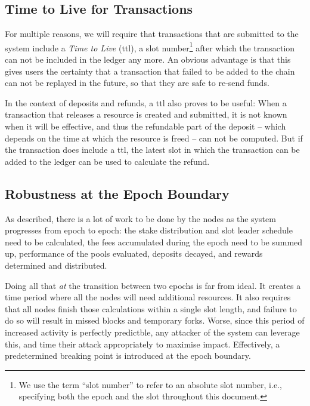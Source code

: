 \documentclass[11pt,a4paper]{article}
\begin{document}
\subsection{Time to Live for Transactions}
\label{time-to-live-for-transactions}

For multiple reasons, we will require that transactions that are submitted to
the system include a \emph{Time to Live} (ttl), a slot number\footnote{We use
  the term ``slot number'' to refer to an absolute slot number, i.e., specifying
  both the epoch and the slot throughout this document.} after which the
transaction can not be included in the ledger any more. An obvious advantage is
that this gives users the certainty that a transaction that failed to be added
to the chain can not be replayed in the future, so that they are safe to re-send
funds.

In the context of deposits and refunds, a ttl also proves to be useful: When a
transaction that releases a resource is created and submitted, it is not known
when it will be effective, and thus the refundable part of the deposit -- which
depends on the time at which the resource is freed -- can not be computed. But
if the transaction does include a ttl, the latest slot in which the transaction
can be added to the ledger can be used to calculate the refund.

\subsection{Robustness at the Epoch Boundary}
\label{robustness-at-the-epoch-boundary}

As described, there is a lot of work to be done by the nodes as the system
progresses from epoch to epoch: the stake distribution and slot leader schedule
need to be calculated, the fees accumulated during the epoch need to be
summed up, performance of the pools evaluated, deposits decayed, and
rewards determined and distributed.

Doing all that \emph{at} the transition between two epochs is far from ideal. It
creates a time period where all the nodes will need additional resources. It
also requires that all nodes finish those calculations within a single slot
length, and failure to do so will result in missed blocks and temporary forks.
Worse, since this period of increased activity is perfectly predictble, any
attacker of the system can leverage this, and time their attack appropriately to
maximise impact. Effectively, a predetermined breaking point is introduced at
the epoch boundary.
\end{document}
